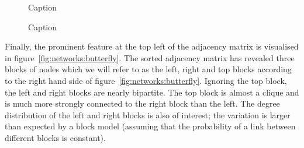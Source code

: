 \begin{figure}[ht]
  \centering
{}
  \caption{Caption}
  \label{fig:networks:sparse}
\end{figure}

\begin{figure}[ht]
  \centering
{}
  \caption{Caption}
  \label{fig:networks:hubs}
\end{figure}

Finally, the prominent feature at the top left of the adjacency matrix is visualised in figure~\ref{fig:networks:butterfly}.
The sorted adjacency matrix has revealed three blocks of nodes which we will refer to as the left, right and top blocks according to the right hand side of figure~\ref{fig:networks:butterfly}.
Ignoring the top block, the left and right blocks are nearly bipartite.
The top block is almost a clique and is much more strongly connected to the right block than the left.
The degree distribution of the left and right blocks is also of interest; the variation is larger than expected by a block model (assuming that the probability of a link between different blocks is constant).

